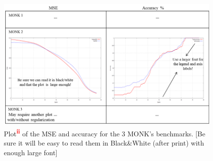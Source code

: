\documentclass[12pt, letterpaper]{article}  %
\begin{document}
\vspace{-0.5cm}
\begin{figure}[h!]
\centering
\includegraphics[width=\textwidth]{monkplot.png}
\caption{Plot\textsuperscript{\textcolor{red}{\textbf{ii}}} of the MSE and accuracy for the 3 MONK’s benchmarks. [Be sure it will be easy to read them in Black\&White (after print) with enough large font]}
\label{fig:monkplot}
\end{figure}

\newpage
\end{document}

